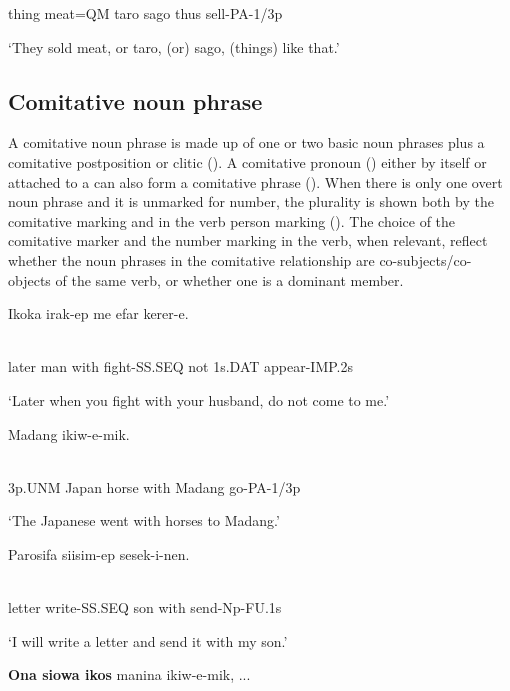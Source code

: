 thing  meat=QM  taro  sago  thus  sell-PA-1/3p

`They sold meat, or taro, (or) sago, (things) like that.'

\subsection{Comitative noun phrase}
{}
A comitative noun phrase is made up of one or two basic noun phrases plus a comitative postposition or clitic (). A comitative pronoun () either by itself or attached to a  can also form a comitative phrase (). When there is only one overt noun phrase and it  is unmarked for number, the plurality is shown both by the comitative marking and in the verb person marking (). The choice of the comitative marker and the number marking in the verb, when relevant,  reflect whether the noun phrases in the comitative relationship are co-subjects/co-objects of the same verb, or whether one is a dominant member. 

\ea%
\label{ex:x828}
\gll Ikoka    irak-ep  me  efar  kerer-e. \\
      \\
\glt
\z

later  man  with  fight-SS.SEQ  not  1s.DAT  appear-IMP.2s

`Later when you fight with your husband, do not come to me.'

\ea%
\label{ex:x829}
\gll {}  Madang  ikiw-e-mik. \\
      \\
\glt
\z

3p.UNM  Japan  horse  with  Madang  go-PA-1/3p

`The Japanese went with horses to Madang.'

\ea%
\label{ex:x830}
\gll Parosifa  siisim-ep    sesek-i-nen. \\
      \\
\glt
\z

letter  write-SS.SEQ  son  with  send-Np-FU.1s

`I will write a letter and send it with my son.'

\ea%
\label{ex:x819}
\gll \textbf{Ona  siowa  ikos } manina  ikiw-e-mik, ... \\
      \\
\glt
\z

